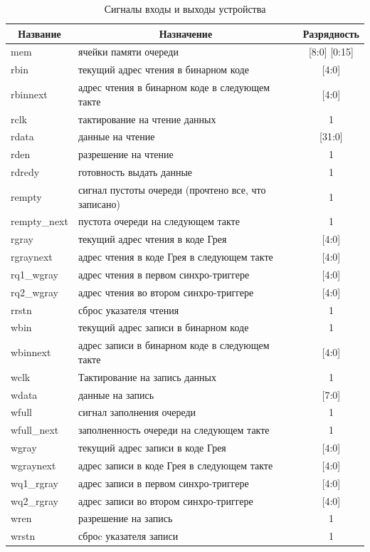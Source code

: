 \begin{table}[h!]
	\fontsize{12}{16pt}\selectfont
	\centering
	\caption{Сигналы входы и выходы устройства}
	\label{tab:sig-ports}
	\begin{tabular}{|l|l|c|}
		\hline
		\multicolumn{1}{|c}{\textbf{Название}} & \multicolumn{1}{|c|}{\textbf{Назначение}} & \multicolumn{1}{c|}{\textbf{Разрядность}} \\ \hline
		mem  &  ячейки памяти очереди & [8:0] [0:15] \\ \hline
		rbin  &  текущий адрес чтения в бинарном коде & [4:0] \\ \hline
		rbinnext  &  адрес чтения в бинарном коде в следующем такте & [4:0] \\ \hline
		rclk  &  тактирование на чтение данных & 1 \\ \hline
		rdata  &  данные на чтение & [31:0] \\ \hline
		rden  &  разрешение на чтение & 1 \\ \hline
		rdredy  &  готовность выдать данные & 1 \\ \hline
		rempty  &  сигнал пустоты очереди (прочтено все, что записано) & 1 \\ \hline
		rempty\_next  &  пустота очереди на следующем такте & 1 \\ \hline
		rgray  &  текущий адрес чтения в коде Грея & [4:0] \\ \hline
		rgraynext  &  адрес чтения в коде Грея в следующем такте & [4:0] \\ \hline
		rq1\_wgray  &  адрес чтения в первом синхро-триггере & [4:0] \\ \hline
		rq2\_wgray  &  адрес чтения во втором синхро-триггере & [4:0] \\ \hline
		rrstn  &  сброс указателя чтения & 1 \\ \hline
		wbin  &  текущий адрес записи в бинарном коде & 1 \\ \hline
		wbinnext  &  адрес записи в бинарном коде в следующем такте & [4:0] \\ \hline
		wclk  &  Тактирование на запись данных & 1 \\ \hline
		wdata  &  данные на запись & [7:0] \\ \hline
		wfull  &  сигнал заполнения очереди & 1 \\ \hline
		wfull\_next  &  заполненность очереди на следующем такте & 1 \\ \hline
		wgray  &  текущий адрес записи в коде Грея & [4:0] \\ \hline
		wgraynext  &  адрес записи в коде Грея в следующем такте & [4:0] \\ \hline
		wq1\_rgray  &  адрес записи в первом синхро-триггере & [4:0] \\ \hline
		wq2\_rgray  &  адрес записи во втором синхро-триггере & [4:0] \\ \hline
		wren  &  разрешение на запись & 1 \\ \hline
		wrstn  &  сброc указателя записи & 1 \\ \hline
	\end{tabular}
\end{table}
\normalsize
\clearpage







\clearpage